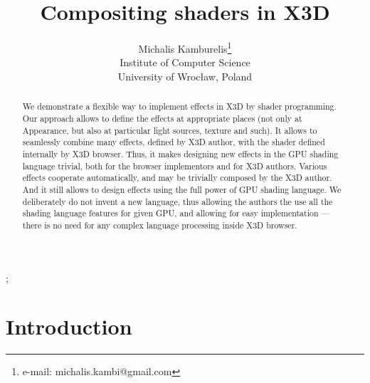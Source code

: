 \documentclass{acmsiggraph}                     %
\title{Compositing shaders in X3D}
\author{Michalis Kamburelis\thanks{e-mail: michalis.kambi@gmail.com}\\Institute of Computer Science\\University of Wroc{\l}aw, Poland}
\begin{document}

\maketitle

\begin{abstract}
We demonstrate a flexible way to implement effects in X3D by shader programming.
Our approach allows to define the effects at appropriate places
(not only at Appearance, but also at particular light sources, texture and such).
It allows to seamlessly combine many effects, defined by X3D author,
with the shader defined internally by X3D browser.
Thus, it makes designing new effects in the GPU shading language trivial,
both for the browser implementors and for X3D authors. Various effects
cooperate automatically, and may be trivially composed by the X3D author.
And it still allows to design effects using the full power of GPU shading
language. We deliberately do not invent a new language, thus allowing
the authors the use all the shading language features for given GPU,
and allowing for easy implementation --- there is no need for any complex
language processing inside X3D browser.
\end{abstract}

\begin{CRcatlist}
  ;
\end{CRcatlist}

\keywordlist


\section{Introduction}
\end{document}
